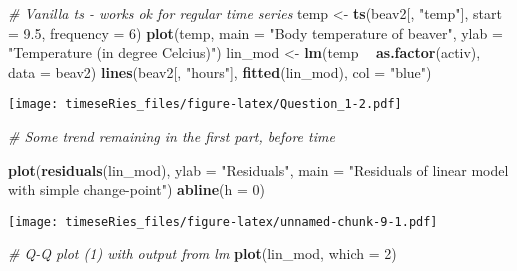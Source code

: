 \documentclass[]{book}
\newenvironment{Shaded}{\begin{snugshade}}{\end{snugshade}}
\newcommand{\KeywordTok}[1]{\textcolor[rgb]{0.13,0.29,0.53}{\textbf{#1}}}
\newcommand{\DataTypeTok}[1]{\textcolor[rgb]{0.13,0.29,0.53}{#1}}
\newcommand{\DecValTok}[1]{\textcolor[rgb]{0.00,0.00,0.81}{#1}}
\newcommand{\FloatTok}[1]{\textcolor[rgb]{0.00,0.00,0.81}{#1}}
\newcommand{\StringTok}[1]{\textcolor[rgb]{0.31,0.60,0.02}{#1}}
\newcommand{\CommentTok}[1]{\textcolor[rgb]{0.56,0.35,0.01}{\textit{#1}}}
\newcommand{\OperatorTok}[1]{\textcolor[rgb]{0.81,0.36,0.00}{\textbf{#1}}}
\newcommand{\NormalTok}[1]{#1}
\begin{document}
\begin{Shaded}
\begin{Highlighting}[]
\CommentTok{# Vanilla ts - works ok for regular time series}
\NormalTok{temp <-}\StringTok{ }\KeywordTok{ts}\NormalTok{(beav2[, }\StringTok{"temp"}\NormalTok{], }\DataTypeTok{start =} \FloatTok{9.5}\NormalTok{, }\DataTypeTok{frequency =} \DecValTok{6}\NormalTok{)}
\KeywordTok{plot}\NormalTok{(temp, }\DataTypeTok{main =} \StringTok{"Body temperature of beaver"}\NormalTok{, }\DataTypeTok{ylab =} \StringTok{"Temperature (in degree Celcius)"}\NormalTok{)}
\NormalTok{lin_mod <-}\StringTok{ }\KeywordTok{lm}\NormalTok{(temp }\OperatorTok{~}\StringTok{ }\KeywordTok{as.factor}\NormalTok{(activ), }\DataTypeTok{data =}\NormalTok{ beav2)}
\KeywordTok{lines}\NormalTok{(beav2[, }\StringTok{"hours"}\NormalTok{], }\KeywordTok{fitted}\NormalTok{(lin_mod), }\DataTypeTok{col =} \StringTok{"blue"}\NormalTok{)}
\end{Highlighting}
\end{Shaded}

\texttt{[image: timeseRies\_files/figure-latex/Question\_1-2.pdf]}

\begin{Shaded}
\begin{Highlighting}[]
\CommentTok{# Some trend remaining in the first part, before time}
\end{Highlighting}
\end{Shaded}

\begin{Shaded}
\begin{Highlighting}[]
\KeywordTok{plot}\NormalTok{(}\KeywordTok{residuals}\NormalTok{(lin_mod), }\DataTypeTok{ylab =} \StringTok{"Residuals"}\NormalTok{, }\DataTypeTok{main =} \StringTok{"Residuals of linear model with simple change-point"}\NormalTok{)}
\KeywordTok{abline}\NormalTok{(}\DataTypeTok{h =} \DecValTok{0}\NormalTok{)}
\end{Highlighting}
\end{Shaded}

\texttt{[image: timeseRies\_files/figure-latex/unnamed-chunk-9-1.pdf]}

\begin{Shaded}
\begin{Highlighting}[]
\CommentTok{# Q-Q plot (1) with output from lm}
\KeywordTok{plot}\NormalTok{(lin_mod, }\DataTypeTok{which =} \DecValTok{2}\NormalTok{)}
\end{Highlighting}
\end{Shaded}
\end{document}

